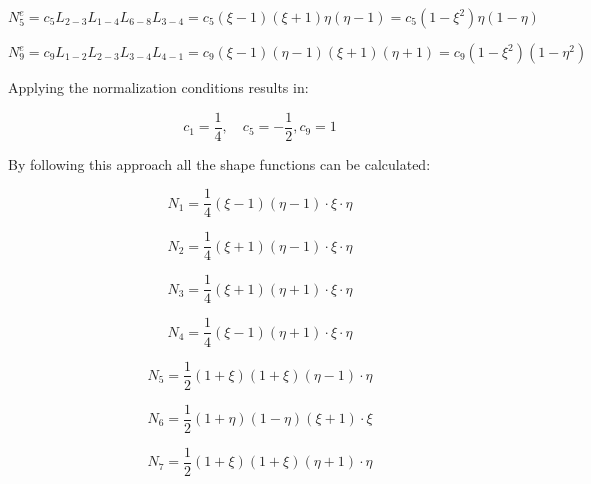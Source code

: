 \begin{equation} \label{eq: Quad8_2}
N_5^e = c_5L_{2-3} L_{1-4} L_{6-8} L_{3-4} = c_5 \left(\xi -1 \right) \left( \xi +1\right) \eta \left( \eta -1\right) = c_5 \left(1-\xi^2\right) \eta \left(1 - \eta\right)
\end{equation}

\begin{equation} \label{eq: Quad8_3}
N_9^e = c_9L_{1-2} L_{2-3} L_{3-4} L_{4-1} = c_9 \left(\xi -1 \right) \left( \eta - 1\right) \left(\xi + 1\right) \left( \eta + 1\right) = c_9 \left(1-\xi^2\right) \left(1 - \eta^2\right)
\end{equation}

Applying the normalization conditions results in:

\begin{equation*}
c_1 = \frac{1}{4}, \quad c_5 = -\frac{1}{2}, c_9 = 1
\end{equation*}

By following this approach all the shape functions can be calculated:

\begin{equation}
N_1 = \frac{1}{4} \left(\xi - 1\right) \left( \eta -1 \right) \cdot\xi \cdot\eta
\end{equation}

\begin{equation}
N_2 = \frac{1}{4} \left(\xi + 1\right) \left( \eta -1 \right) \cdot\xi \cdot\eta
\end{equation}

\begin{equation}
N_3 = \frac{1}{4} \left(\xi + 1\right) \left( \eta + 1 \right) \cdot\xi \cdot\eta
\end{equation}

\begin{equation}
N_4 = \frac{1}{4} \left(\xi - 1\right) \left( \eta + 1 \right) \cdot\xi \cdot\eta
\end{equation}

\begin{equation}
N_5 = \frac{1}{2} \left(1 + \xi \right) \left( 1 + \xi \right)  \left( \eta - 1\right) \cdot\eta
\end{equation}

\begin{equation}
N_6 = \frac{1}{2} \left(1 + \eta \right) \left( 1 - \eta \right)  \left( \xi + 1\right) \cdot\xi
\end{equation}

\begin{equation}
N_7 = \frac{1}{2} \left(1 + \xi \right) \left( 1 + \xi \right)  \left( \eta + 1\right) \cdot\eta
\end{equation}

